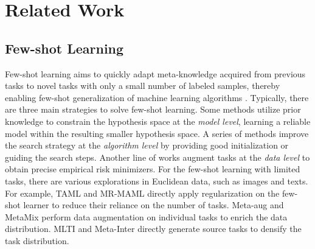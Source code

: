 \section{Related Work}
\subsection{Few-shot Learning}
Few-shot learning aims to quickly adapt meta-knowledge acquired from previous tasks to novel tasks with only a small number of labeled samples, thereby enabling few-shot generalization of machine learning algorithms \cite{finn2017model, finn2019online, hospedales2021meta}. %
Typically, there are three main strategies to solve few-shot learning. Some methods \cite{vinyals2016matching, snell2017prototypical, mishra2017simple} utilize prior knowledge to constrain the hypothesis space at the \textit{model level}, learning a reliable model within the resulting smaller hypothesis space. A series of methods \cite{finn2018probabilistic, flennerhag2019meta, grant2018recasting, rusu2018meta, oh2020boil} improve the search strategy at the \textit{algorithm level} by providing good initialization or guiding the search steps. Another line of works \cite{hariharan2017low, xu2021augnlg, yao2021improving} augment tasks at the \textit{data level} to obtain precise empirical risk minimizers. For the few-shot learning with limited tasks, there are various explorations in Euclidean data, such as images and texts. For example, TAML \cite{jamal2019task} and MR-MAML \cite{yin2019meta} directly apply regularization on the few-shot learner to reduce their reliance on the number of tasks. Meta-aug \cite{rajendran2020meta} and MetaMix \cite{yao2021improving} perform data augmentation on individual tasks to enrich the data distribution. MLTI \cite{yao2021meta} and Meta-Inter \cite{lee2022set} directly generate source tasks to densify the task distribution. 

